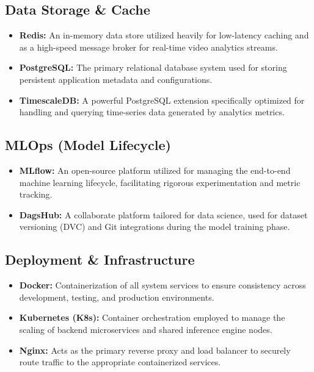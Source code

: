 \subsection{Data Storage \& Cache}
\begin{itemize}[leftmargin=80pt]
    \item \textbf{Redis:} An in-memory data store utilized heavily for low-latency caching and as a high-speed message broker for real-time video analytics streams.
    \item \textbf{PostgreSQL:} The primary relational database system used for storing persistent application metadata and configurations.
    \item \textbf{TimescaleDB:} A powerful PostgreSQL extension specifically optimized for handling and querying time-series data generated by analytics metrics.
\end{itemize}

\subsection{MLOps (Model Lifecycle)}
\begin{itemize}[leftmargin=80pt]
    \item \textbf{MLflow:} An open-source platform utilized for managing the end-to-end machine learning lifecycle, facilitating rigorous experimentation and metric tracking.
    \item \textbf{DagsHub:} A collaborate platform tailored for data science, used for dataset versioning (DVC) and Git integrations during the model training phase.
\end{itemize}

\subsection{Deployment \& Infrastructure}
\begin{itemize}[leftmargin=80pt]
    \item \textbf{Docker:} Containerization of all system services to ensure consistency across development, testing, and production environments.
    \item \textbf{Kubernetes (K8s):} Container orchestration employed to manage the scaling of backend microservices and shared inference engine nodes.
    \item \textbf{Nginx:} Acts as the primary reverse proxy and load balancer to securely route traffic to the appropriate containerized services.
\end{itemize}

